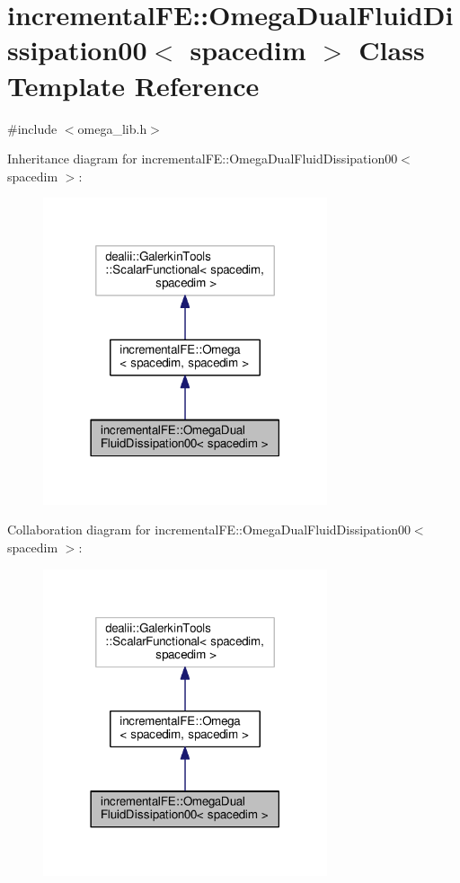 \hypertarget{classincremental_f_e_1_1_omega_dual_fluid_dissipation00}{}\section{incremental\+FE\+:\+:Omega\+Dual\+Fluid\+Dissipation00$<$ spacedim $>$ Class Template Reference}
\label{classincremental_f_e_1_1_omega_dual_fluid_dissipation00}


{\ttfamily \#include $<$omega\+\_\+lib.\+h$>$}



Inheritance diagram for incremental\+FE\+:\+:Omega\+Dual\+Fluid\+Dissipation00$<$ spacedim $>$\+:\nopagebreak
\begin{figure}[H]
\begin{center}
\leavevmode
\includegraphics[width=237pt]{classincremental_f_e_1_1_omega_dual_fluid_dissipation00__inherit__graph}
\end{center}
\end{figure}


Collaboration diagram for incremental\+FE\+:\+:Omega\+Dual\+Fluid\+Dissipation00$<$ spacedim $>$\+:\nopagebreak
\begin{figure}[H]
\begin{center}
\leavevmode
\includegraphics[width=237pt]{classincremental_f_e_1_1_omega_dual_fluid_dissipation00__coll__graph}
\end{center}
\end{figure}
